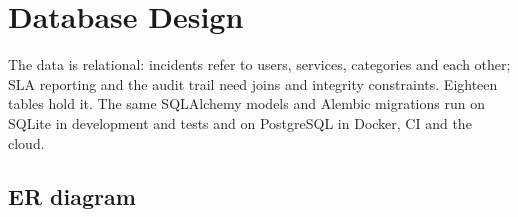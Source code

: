 \chapter{Database Design}\label{ch:database}

The data is relational: incidents refer to users, services, categories and each other; SLA
reporting and the audit trail need joins and integrity constraints. Eighteen tables hold it.
The same SQLAlchemy models and Alembic migrations run on SQLite in development and tests and on
PostgreSQL in Docker, CI and the cloud.

\section{ER diagram}

